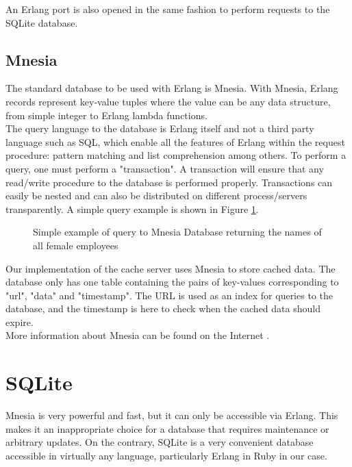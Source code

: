 An Erlang port is also opened in the same fashion to perform requests to the SQLite database.

\subsection{Mnesia}

The standard database to be used with Erlang is Mnesia. With Mnesia, Erlang records represent key-value tuples where the value can be any data structure, from simple integer to Erlang lambda functions.\\

The query language to the database is Erlang itself and not a third party language such as SQL, which enable all the features of Erlang within the request procedure: pattern matching and list comprehension among others. To perform a query, one must perform a "transaction". A transaction will ensure that any read/write procedure to the database is performed properly. Transactions can easily be nested and can also be distributed on different process/servers transparently. A simple query example is shown in Figure \ref{fig:mnesia_example}.\\

\begin{figure}[ht]
  \centering
  \caption{Simple example of query to Mnesia Database returning the names of all female employees}
  \label{fig:mnesia_example}
\end{figure}

Our implementation of the cache server uses Mnesia to store cached data. The database only has one table containing the pairs of key-values corresponding to "url", "data" and "timestamp". The URL is used as an index for queries to the database, and the timestamp is here to check when the cached data should expire.\\

More information about Mnesia can be found on the Internet \cite{Mne10}.

\section{SQLite}

Mnesia is very powerful and fast, but it can only be accessible via Erlang. This makes it an inappropriate choice for a database that requires maintenance or arbitrary updates. On the contrary, SQLite is a very convenient database accessible in virtually any language, particularly Erlang in Ruby in our case.\\

